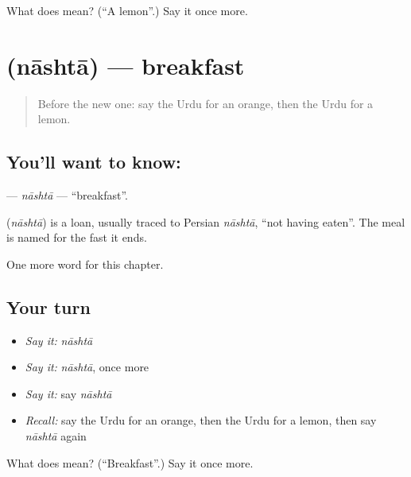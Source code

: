 \begin{tcolorbox}[breakable,colback=teal!4,colframe=teal!35!black,title={Before you move on}]
What does  mean? (\textquotedblleft{}A lemon\textquotedblright{}.) Say it once more.
\end{tcolorbox}
\section[\texorpdfstring{\ur{ناشتہ} (nāshtā)}{ناشتہ (nāshtā)}]{ (nāshtā) — breakfast}

\label{lesson:UR-C57-nashta}



\begin{quote}
Before the new one: say the Urdu for an orange, then the Urdu for a lemon.
\end{quote}

\subsection*{You'll want to know: }
\textbf{} — \emph{nāshtā} — \textquotedblleft{}breakfast\textquotedblright{}.

\begin{cousinweb}
\textbf{} (\emph{nāshtā}) is a loan, usually traced to Persian \emph{nāshtā}, \textquotedblleft{}not having eaten\textquotedblright{}. The meal is named for the fast it ends.
\end{cousinweb}

\begin{grammarlens}[title={What you've built}]
One more word for this chapter.
\end{grammarlens}

\subsection*{Your turn}
\begin{itemize}
\raggedright
  \item \emph{Say it:} \emph{nāshtā}
  \item \emph{Say it:} \emph{nāshtā}, once more
  \item \emph{Say it:} say \emph{nāshtā}
  \item \emph{Recall:} say the Urdu for an orange, then the Urdu for a lemon, then say \emph{nāshtā} again
\end{itemize}

\begin{tcolorbox}[breakable,colback=teal!4,colframe=teal!35!black,title={Before you move on}]
What does  mean? (\textquotedblleft{}Breakfast\textquotedblright{}.) Say it once more.
\end{tcolorbox}
